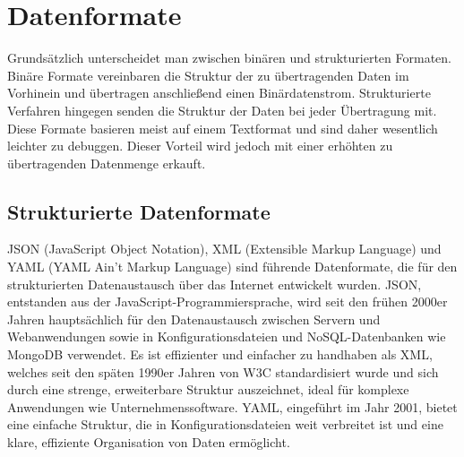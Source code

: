 \chapter{Datenformate}

Grundsätzlich unterscheidet man zwischen binären und strukturierten Formaten. Binäre Formate vereinbaren die Struktur der zu übertragenden Daten im Vorhinein und übertragen anschließend einen Binärdatenstrom. Strukturierte Verfahren hingegen senden die Struktur der Daten bei jeder Übertragung mit. Diese Formate basieren meist auf einem Textformat und sind daher wesentlich leichter zu debuggen. Dieser Vorteil wird jedoch mit einer erhöhten zu übertragenden Datenmenge erkauft.


\section{Strukturierte Datenformate}

JSON (JavaScript Object Notation), XML (Extensible Markup Language) und YAML (YAML Ain't Markup Language) sind führende Datenformate, die für den strukturierten Datenaustausch über das Internet entwickelt wurden. JSON, entstanden aus der JavaScript-Programmiersprache, wird seit den frühen 2000er Jahren hauptsächlich für den Datenaustausch zwischen Servern und Webanwendungen sowie in Konfigurationsdateien und NoSQL-Datenbanken wie MongoDB verwendet. Es ist effizienter und einfacher zu handhaben als XML, welches seit den späten 1990er Jahren von W3C standardisiert wurde und sich durch eine strenge, erweiterbare Struktur auszeichnet, ideal für komplexe Anwendungen wie Unternehmenssoftware. YAML, eingeführt im Jahr 2001, bietet eine einfache Struktur, die in Konfigurationsdateien weit verbreitet ist und eine klare, effiziente Organisation von Daten ermöglicht.

